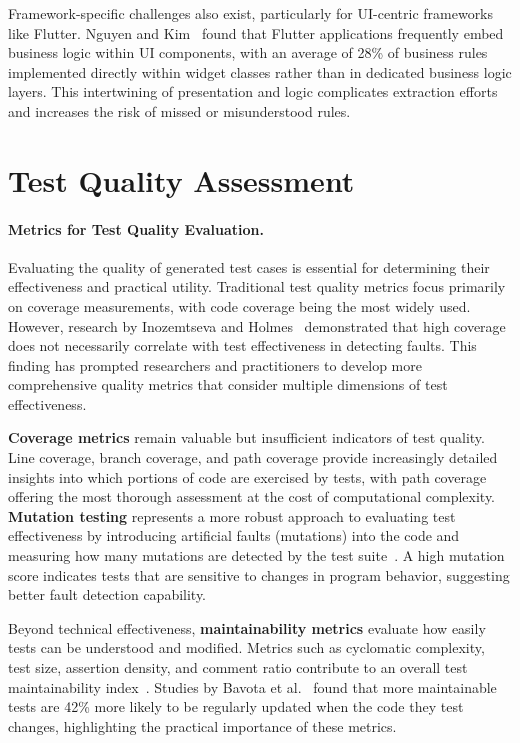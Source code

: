 \hspace{0.5cm} Framework-specific challenges also exist, particularly for UI-centric frameworks like Flutter. Nguyen and Kim~\cite{UIBusinessLogic} found that Flutter applications frequently embed business logic within UI components, with an average of 28\% of business rules implemented directly within widget classes rather than in dedicated business logic layers. This intertwining of presentation and logic complicates extraction efforts and increases the risk of missed or misunderstood rules.

\section{Test Quality Assessment}

\paragraph{Metrics for Test Quality Evaluation.} Evaluating the quality of generated test cases is essential for determining their effectiveness and practical utility. Traditional test quality metrics focus primarily on coverage measurements, with code coverage being the most widely used. However, research by Inozemtseva and Holmes~\cite{TestCoverageLimitations} demonstrated that high coverage does not necessarily correlate with test effectiveness in detecting faults. This finding has prompted researchers and practitioners to develop more comprehensive quality metrics that consider multiple dimensions of test effectiveness.

\hspace{0.5cm} \textbf{Coverage metrics} remain valuable but insufficient indicators of test quality. Line coverage, branch coverage, and path coverage provide increasingly detailed insights into which portions of code are exercised by tests, with path coverage offering the most thorough assessment at the cost of computational complexity. \textbf{Mutation testing} represents a more robust approach to evaluating test effectiveness by introducing artificial faults (mutations) into the code and measuring how many mutations are detected by the test suite~\cite{MutationTesting}. A high mutation score indicates tests that are sensitive to changes in program behavior, suggesting better fault detection capability.

\hspace{0.5cm} Beyond technical effectiveness, \textbf{maintainability metrics} evaluate how easily tests can be understood and modified. Metrics such as cyclomatic complexity, test size, assertion density, and comment ratio contribute to an overall test maintainability index~\cite{TestMaintainability}. Studies by Bavota et al.~\cite{TestReadability} found that more maintainable tests are 42\% more likely to be regularly updated when the code they test changes, highlighting the practical importance of these metrics.

